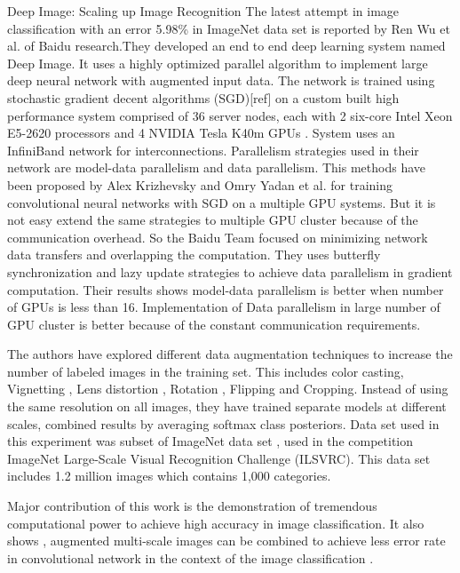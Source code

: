 \documentclass{article}
\begin{document}
\begin{section}{Deep Image: Scaling up Image Recognition}
The latest attempt in image classification with an error 5.98\% in ImageNet data set is reported by  Ren Wu et al.\cite{Wu2015} of Baidu research.They developed an end to end deep learning  system named Deep Image. It uses a highly optimized parallel algorithm  to implement large deep neural network with augmented input data. The network is trained using stochastic gradient decent algorithms (SGD)[ref] on a custom built high performance system comprised of 36 server nodes, each with 2 six-core Intel Xeon E5-2620 processors and 4 NVIDIA Tesla K40m GPUs . System  uses an InfiniBand  network for interconnections. Parallelism strategies used in their network are model-data parallelism and data parallelism.  This methods have been proposed by Alex Krizhevsky \cite{Krizhevsky2014} and Omry Yadan et al.\cite{Yadan2013} for training convolutional neural networks with SGD on a  multiple GPU systems. But it is not easy extend the same strategies to multiple GPU cluster because of the communication overhead. So the  Baidu Team focused on minimizing network data transfers and overlapping the computation. They uses butterfly synchronization and lazy update strategies to achieve data parallelism in gradient computation. Their results shows model-data parallelism is better when number of GPUs is less than 16. Implementation of Data parallelism in large number  of GPU  cluster is better because of the constant communication requirements.
\par
The authors have explored different data augmentation techniques to increase the number of labeled images in the training set. This includes color casting, Vignetting , Lens distortion , Rotation , Flipping and  Cropping. Instead of using the same resolution on all images, they have trained separate models at different scales, combined results by averaging softmax class posteriors.
Data set used in this experiment was subset of ImageNet data set , used in the competition ImageNet Large-Scale Visual Recognition Challenge (ILSVRC)\cite{Berg2010}. This data set includes 1.2 million images which contains 1,000 categories.
\par
 Major contribution of this work is the demonstration of tremendous computational power to achieve high accuracy in image classification.
It also shows , augmented multi-scale images can be combined to achieve less error rate in convolutional network in the context of the image classification . 
 \end{section}
\end{document}
